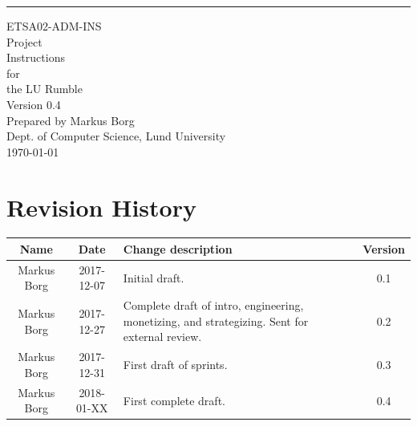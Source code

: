 \documentclass{scrreprt}
\date{}
\def\myversion{0.4 }
\begin{document}
\begin{flushright}
    \rule{16cm}{5pt}\vskip1cm
    \begin{bfseries}
    	\LARGE{ETSA02-ADM-INS}\\
    	\vspace{1.5cm}
        \Huge{Project\\ Instructions}\\
        \vspace{0.5cm}
        for\\
        \vspace{0.5cm}
        the LU Rumble\\
        \vspace{1.5cm}
        \LARGE{Version \myversion}\\ %
        \vspace{1.5cm}
        Prepared by Markus Borg\\
        Dept. of Computer Science, Lund University\\
        \vspace{1.5cm}
        \today\\
    \end{bfseries}
\end{flushright}

\tableofcontents


\chapter*{Revision History}

\begin{center}
    \begin{tabular}{|c|c|p{8cm}|c|}
        \hline
	    Name & Date & Change description & Version\\
        \hline
	    Markus Borg & 2017-12-07 & Initial draft. & 0.1\\
        \hline
        Markus Borg & 2017-12-27 & Complete draft of intro, engineering, monetizing, and strategizing. Sent for external review. & 0.2\\
        \hline
        Markus Borg & 2017-12-31 & First draft of sprints. & 0.3\\
        \hline
        Markus Borg & 2018-01-XX & First complete draft. & 0.4\\
        \hline
    \end{tabular}
\end{center}
\end{document}
